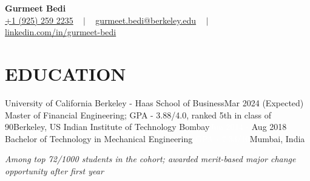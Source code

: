 


\begin{center}
{\Huge  \textbf{Gurmeet Bedi}} \\ \vspace{1pt}
\small
\href{tel:19252592235}{+1 (925) 259 2235} 
~ $\mid$ ~
\href{mailto:gurmeet.bedi@berkeley.edu}{ gurmeet.bedi@berkeley.edu} 
~ $\mid$ ~
\href{https://www.linkedin.com/in/gurmeet-bedi/}{linkedin.com/in/gurmeet-bedi} 
\\
\vspace{-8pt}
\end{center}


\section{EDUCATION}
  \resumeSubHeadingListStart
  \resumeSubheading
      {University of California Berkeley - Haas School of Business}{Mar 2024 (Expected)}
      {Master \textcolor{white}{}of Financial Engineering; GPA - 3.88/4.0, ranked 5th in class of 90}{Berkeley, US}{}
    \resumeSubheading
      {Indian Institute of Technology Bombay}{\textcolor{white}{Jun 2014 - }Aug 2018}
      {Bachelor of Technology in Mechanical Engineering \textcolor{white}{GPA - 7.33/10}}{Mumbai, India}{}
      
    \begin{itemize}[leftmargin=0.0in, label={}]
    \small{\textit{Among top 72/1000 students in the cohort; awarded merit-based major change opportunity after first year}}
    \vspace{-3pt}
    \end{itemize}
  \resumeSubHeadingListEnd

